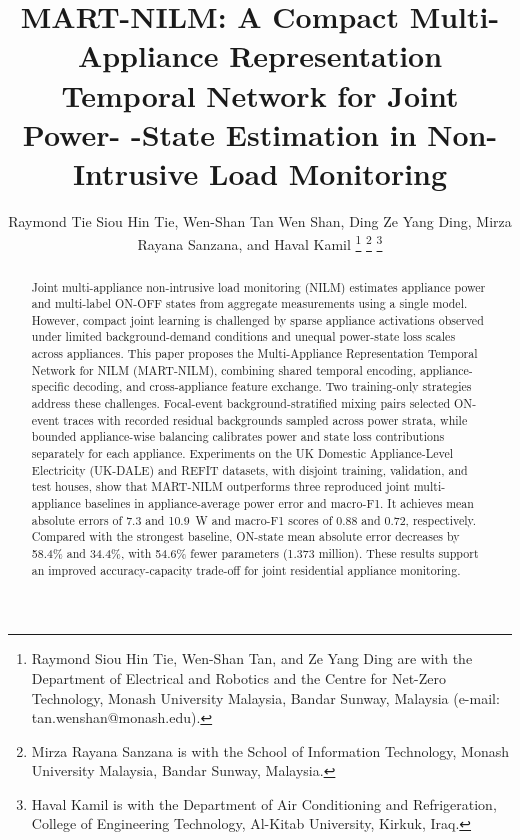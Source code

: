 \documentclass[journal]{IEEEtran}
\providecommand{\DIFadd}[1]{{\protect\color{blue} \sf #1}} %
\providecommand{\DIFdel}[1]{{\protect\color{red} \scriptsize #1}} %
\providecommand{\DIFaddbegin}{} %
\providecommand{\DIFaddend}{} %
\providecommand{\DIFdelbegin}{} %
\providecommand{\DIFdelend}{} %
\providecommand{\DIFscaledelfig}{0.5}
\newlength{\DIFdelgraphicswidth} %
\newlength{\DIFdelgraphicsheight} %
\providecommand{\DIFaddincludegraphics}[2][]{{\color{blue}\fbox{\DIFOincludegraphics[#1]{#2}}}} %
\providecommand{\DIFdelincludegraphics}[2][]{%
\sbox{\DIFdelgraphicsbox}{\DIFOincludegraphics[#1]{#2}}%
\settoboxwidth{\DIFdelgraphicswidth}{\DIFdelgraphicsbox} %
\settoboxtotalheight{\DIFdelgraphicsheight}{\DIFdelgraphicsbox} %
\scalebox{\DIFscaledelfig}{%
\parbox[b]{\DIFdelgraphicswidth}{\usebox{\DIFdelgraphicsbox}\\[-\baselineskip] \rule{\DIFdelgraphicswidth}{0em}}\llap{\resizebox{\DIFdelgraphicswidth}{\DIFdelgraphicsheight}{%
\setlength{\unitlength}{\DIFdelgraphicswidth}%
\begin{picture}(1,1)%
\thicklines\linethickness{2pt} %
{\color[rgb]{1,0,0}\put(0,0){\framebox(1,1){}}}%
{\color[rgb]{1,0,0}\put(0,0){\line( 1,1){1}}}%
{\color[rgb]{1,0,0}\put(0,1){\line(1,-1){1}}}%
\end{picture}%
}\hspace*{3pt}}} %
} %
\DeclareRobustCommand{\DIFaddbegin}{\DIFOaddbegin \let\includegraphics\DIFaddincludegraphics} %
\DeclareRobustCommand{\DIFaddend}{\DIFOaddend \let\includegraphics\DIFOincludegraphics} %
\DeclareRobustCommand{\DIFdelbegin}{\DIFOdelbegin \let\includegraphics\DIFdelincludegraphics} %
\DeclareRobustCommand{\DIFdelend}{\DIFOaddend \let\includegraphics\DIFOincludegraphics} %
\begin{document}
\title{MART-NILM: A Compact Multi-Appliance Representation Temporal Network for Joint Power-\DIFdelbegin \DIFdel{-}\DIFdelend State Estimation in Non-Intrusive Load Monitoring}

\author{Raymond \DIFdelbegin \DIFdel{Tie }\DIFdelend Siou Hin \DIFaddbegin \DIFadd{Tie}\DIFaddend , \DIFaddbegin \DIFadd{Wen-Shan }\DIFaddend Tan\DIFdelbegin \DIFdel{Wen Shan}\DIFdelend , \DIFdelbegin \DIFdel{Ding }\DIFdelend Ze Yang \DIFaddbegin \DIFadd{Ding}\DIFaddend ,
Mirza Rayana Sanzana, and Haval Kamil%
\DIFdelbegin %
\DIFdelend \DIFaddbegin \thanks{Raymond Siou Hin Tie, Wen-Shan Tan, and Ze Yang Ding are with the
Department of Electrical and Robotics and the Centre for Net-Zero Technology,
Monash University Malaysia, Bandar Sunway, Malaysia
(e-mail: tan.wenshan@monash.edu).}\DIFaddend %
\thanks{Mirza Rayana Sanzana is with the School of Information Technology,
Monash University Malaysia, Bandar Sunway, Malaysia.}%
\thanks{Haval Kamil is with the Department of Air Conditioning and
Refrigeration, College of Engineering Technology, Al-Kitab University,
Kirkuk, Iraq.}}

\maketitle

\begin{abstract}
Joint multi-appliance non-intrusive load monitoring (NILM) estimates appliance power and multi-label ON-OFF states from aggregate measurements using a single model. However, compact joint learning is challenged by sparse appliance activations observed under limited background-demand conditions and unequal power-state loss scales across appliances. This paper proposes the Multi-Appliance Representation Temporal Network for NILM (MART-NILM), combining shared temporal encoding, appliance-specific decoding, and cross-appliance feature exchange. Two training-only strategies address these challenges. Focal-event background-stratified mixing pairs selected ON-event traces with recorded residual backgrounds sampled across power strata, while bounded appliance-wise balancing calibrates power and state loss contributions separately for each appliance. Experiments on the UK Domestic Appliance-Level Electricity (UK-DALE) and REFIT datasets, with disjoint training, validation, and test houses, show that MART-NILM outperforms three reproduced joint multi-appliance baselines in appliance-average power error and macro-F1. It achieves mean absolute errors of 7.3 and 10.9~W and macro-F1 scores of 0.88 and 0.72, respectively. Compared with the strongest baseline, ON-state mean absolute error decreases by 58.4\% and 34.4\%, with 54.6\% fewer parameters (1.373 million). These results support an improved accuracy-capacity trade-off for joint residential appliance monitoring.
\end{abstract}
\end{document}
